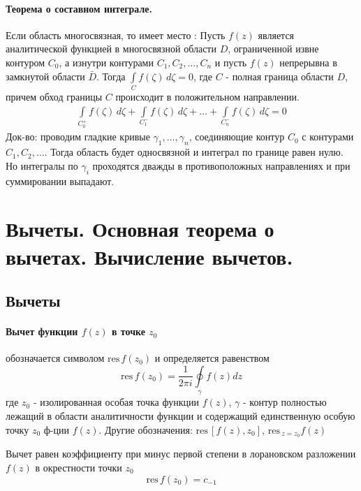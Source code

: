 \documentclass[12pt]{extarticle}
\newcommand{\res}{\mathrm{res}\,}
\renewcommand{\d}{\,d}
\begin{document}
\paragraph{Теорема о составном интеграле.} Если область многосвязная,
то имеет место :
Пусть $f(z)$ является аналитической функцией в многосвязной области $D$,
ограниченной извне контуром $C_{0}$, а изнутри контурами
$C_{1},C_{2},\ldots,C_{n}$ и пусть $f(z)$ непрерывна в замкнутой области
$\bar{D}$. Тогда $\int\limits_{C}f(\zeta)\d\zeta=0$, где $C$ - полная
граница области $D$, причем обход границы $C$ происходит в положительном
направлении.
\begin{eqnarray*}
    \int\limits_{C_{0}^{+}}f(\zeta)\d{\zeta}
    +\int\limits_{C_{1}^{-}}f(\zeta)\d{\zeta}
    +\ldots
    +\int\limits_{C_{n}^{-}}f(\zeta)\d{\zeta}
    =0
\end{eqnarray*}
Док-во: проводим гладкие кривые $\gamma_{1},\ldots,\gamma_{n}$,
соединяющие контур $C_{0}$ с контурами $C_{1},C_{2},\ldots$. Тогда
область будет односвязной и интеграл по границе равен нулю. Но интегралы
по $\gamma_{i}$ проходятся дважды в противоположных направлениях и при
суммировании выпадают.


\section{Вычеты. Основная теорема о вычетах. Вычисление вычетов.}
\subsection{Вычеты}

\paragraph{Вычет функции $f(z)$ в точке $z_{0}$}
обозначается символом $\res f(z_{0})$ и определяется равенством
\begin{displaymath}
    \res f(z_{0})=\frac{1}{2\pi i}\oint\limits_{\gamma}f(z)dz
\end{displaymath}
где $z_{0}$ - изолированная особая точка функции $f(z)$, $\gamma$ -
контур полностью лежащий в области аналитичности функции и содержащий
единственную особую точку $z_{0}$ ф-ции $f(z)$. Другие
обозначения: $\res[f(z),z_{0}]$, $\res_{z=z_{0}}f(z)$
\par Вычет равен коэффициенту при минус первой степени в лорановском
разложении $f(z)$ в окрестности точки $z_{0}$
\begin{displaymath}
    \res f(z_{0})=c_{-1}
\end{displaymath}
\end{document}
